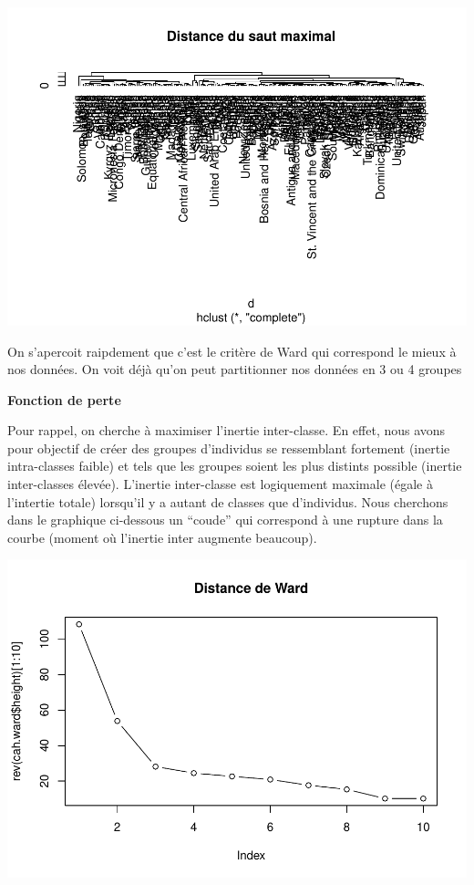 \documentclass[
]{article}
\newenvironment{Shaded}{}{}
\newcommand{\AttributeTok}[1]{#1}
\newcommand{\DecValTok}[1]{#1}
\newcommand{\FunctionTok}[1]{#1}
\newcommand{\NormalTok}[1]{#1}
\newcommand{\SpecialCharTok}[1]{\textcolor[rgb]{0.00,0.50,0.50}{#1}}
\newcommand{\StringTok}[1]{\textcolor[rgb]{0.00,0.50,0.50}{#1}}
\begin{document}
\includegraphics{Projet_files/figure-latex/unnamed-chunk-14-1.pdf}

On s'apercoit raipdement que c'est le critère de Ward qui correspond le
mieux à nos données. On voit déjà qu'on peut partitionner nos données en
3 ou 4 groupes

\textbf{Fonction de perte}

Pour rappel, on cherche à maximiser l'inertie inter-classe. En effet,
nous avons pour objectif de créer des groupes d'individus se ressemblant
fortement (inertie intra-classes faible) et tels que les groupes soient
les plus distints possible (inertie inter-classes élevée). L'inertie
inter-classe est logiquement maximale (égale à l'intertie totale)
lorsqu'il y a autant de classes que d'individus. Nous cherchons dans le
graphique ci-dessous un ``coude'' qui correspond à une rupture dans la
courbe (moment où l'inertie inter augmente beaucoup).

\begin{Shaded}
\end{Shaded}

\includegraphics{Projet_files/figure-latex/unnamed-chunk-15-1.pdf}
\end{document}
